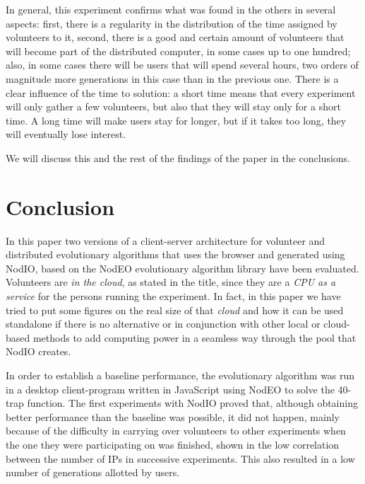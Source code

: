 \documentclass[journal,onecolumn]{IEEEtran}
\begin{document}
In general, this experiment confirms what was found in the others in
several aspects: first, there is a regularity in the distribution of the
time assigned by volunteers to it, second, there is a good and certain
amount of volunteers that will become part of the distributed
computer, in some cases up to one hundred; also, in some cases there
will be users that will spend several hours, two orders of magnitude
more generations in this case than in the previous one. There is a
clear influence of the time to solution: a short time means that every
experiment will only gather a few volunteers, but also that they will
stay only for a short time. A long time will make users stay for
longer, but if it takes too long, they will eventually lose interest. 

We will discuss this and the rest of the findings of the paper in the
conclusions. 

\section{Conclusion}
\label{sec:conclusion}

In this paper two versions of a client-server architecture for volunteer and distributed
evolutionary algorithms that uses the browser and generated using {\sf
  NodIO}, based on the {\sf NodEO} evolutionary algorithm library have been
evaluated. Volunteers are {\em in the cloud}, as stated in the title,
since they are a {\em CPU as a service} for the persons running the
experiment. In fact, in this paper we have tried to put some figures
on the real size of that {\em cloud} and how it can be used standalone
if there is no alternative or in conjunction with other local or
cloud-based methods to add computing power in a seamless way through
the pool that NodIO creates. 

In order to establish a baseline performance, the evolutionary
algorithm was run in a desktop client-program written in JavaScript
using NodEO to solve the 40-trap function. The first experiments with
{\sf NodIO} proved that, although obtaining better performance than the
baseline was possible, it did not happen, mainly because of the
difficulty in carrying over volunteers to other experiments when the
one they were participating on was finished, shown in the low
correlation between the number of IPs in successive experiments. This
also resulted in a low number of generations allotted by users. 
\end{document}
